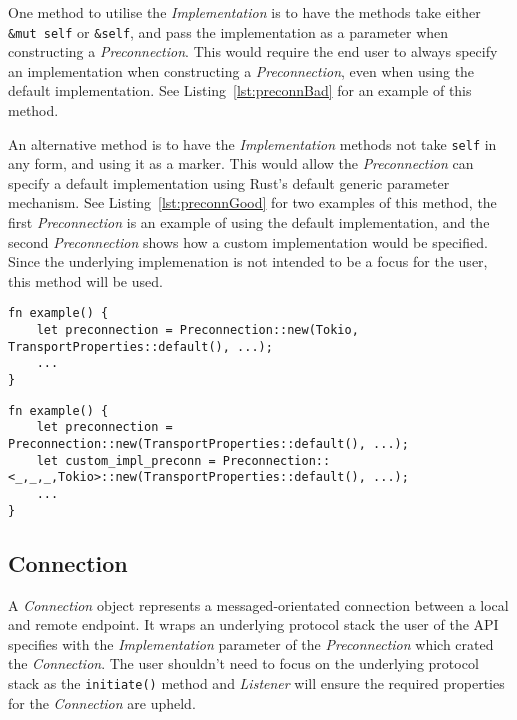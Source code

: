 One method to utilise the \emph{Implementation} is to have the methods take either \texttt{\&mut self} or
\texttt{\&self}, and pass the implementation as a parameter when constructing a \emph{Preconnection}.
This would require the end user to always specify an implementation when constructing a \emph{Preconnection}, even when
using the default implementation.
See Listing~\ref{lst:preconnBad} for an example of this method.

An alternative method is to have the \emph{Implementation} methods not take \texttt{self} in any form, and using it as a
marker.
This would allow the \emph{Preconnection} can specify a default implementation using Rust's default generic parameter
mechanism.
See Listing~\ref{lst:preconnGood} for two examples of this method, the first \emph{Preconnection} is an example of using
the default implementation, and the second \emph{Preconnection} shows how a custom implementation would be specified.
Since the underlying implemenation is not intended to be a focus for the user, this method will be used.

\begin{lstlisting}[float=h, label=lst:preconnBad, caption={An example of how to construct a
Preconnection if the Implementation trait is to be passed when the Preconnection is constructed}]
fn example() {
    let preconnection = Preconnection::new(Tokio, TransportProperties::default(), ...);
    ...
}
\end{lstlisting}

\begin{lstlisting}[float=h, label=lst:preconnGood, caption={An example of how to construct a
Preconnection if the Implementation trait is used as a marker.}]
fn example() {
    let preconnection = Preconnection::new(TransportProperties::default(), ...);
    let custom_impl_preconn = Preconnection::<_,_,_,Tokio>::new(TransportProperties::default(), ...);
    ...
}
\end{lstlisting}

\subsection{Connection}\label{subsec:connection}
A \emph{Connection} object represents a messaged-orientated connection between a local and remote endpoint.
It wraps an underlying protocol stack the user of the API specifies with the \emph{Implementation}
parameter of the \emph{Preconnection} which crated the \emph{Connection}.
The user shouldn't need to focus on the underlying protocol stack as the \texttt{initiate()} method and
\emph{Listener} will ensure the required properties for the \emph{Connection} are upheld.

